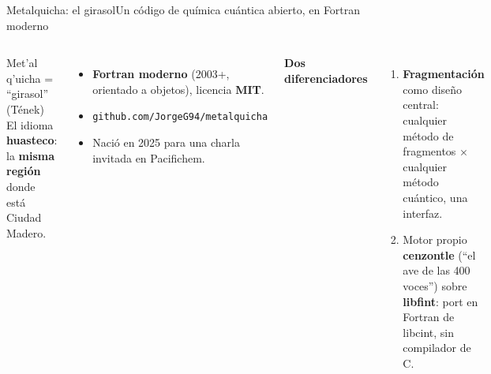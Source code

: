 \documentclass[aspectratio=169]{beamer}
\begin{document}
\begin{frame}{Metalquicha: el girasol}{Un código de química cuántica abierto, en Fortran moderno}
  \begin{columns}[T,onlytextwidth]
      \begin{exampleblock}{Met'al q'uicha = ``girasol'' (Tének)}
        El idioma \textbf{huasteco}: la \textbf{misma región} donde está Ciudad Madero.
      \end{exampleblock}
      \begin{itemize}\setlength\itemsep{3pt}
        \item \textbf{Fortran moderno} (2003+, orientado a objetos), licencia \textbf{MIT}.
        \item \texttt{github.com/JorgeG94/metalquicha}
        \item Nació en 2025 para una charla invitada en Pacifichem.
      \end{itemize}
      \textbf{Dos diferenciadores}
      \begin{enumerate}\setlength\itemsep{3pt}
        \item \textbf{Fragmentación} como diseño central: cualquier método de fragmentos $\times$ cualquier método cuántico, una interfaz.
        \item Motor propio \textbf{cenzontle} (``el ave de las 400 voces'') sobre \textbf{libfint}: port en Fortran de libcint, sin compilador de C.
      \end{enumerate}
  \end{columns}
\end{frame}
\end{document}
